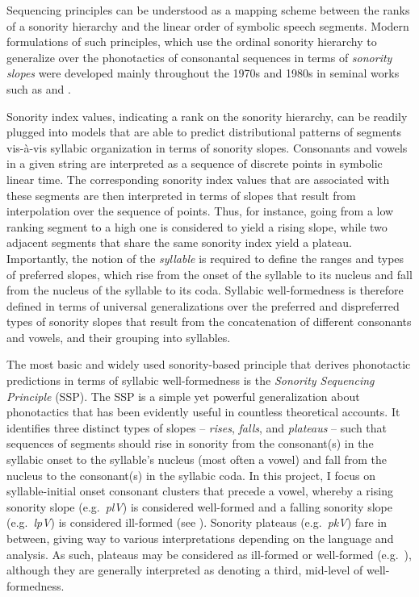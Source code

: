 Sequencing principles can be understood as a mapping scheme between the ranks of a sonority hierarchy and the linear order of symbolic speech segments.
Modern formulations of such principles, which use the ordinal sonority hierarchy to generalize over the phonotactics of consonantal sequences in terms of \emph{sonority slopes} were developed mainly throughout the 1970s and 1980s in seminal works such as \citet{zwicky1972notesk, hankamer1974sonority, hooper1976introduction, kiparsky1979metrical, lowenstamm1981maximal, steriade1982greek, cairns1982markedness, selkirk1984majorsk, harris1983syllablesk, mohanan1986theory} and \citet{clements1990role}.

Sonority index values, indicating a rank on the sonority hierarchy, can be readily plugged into models that are able to predict distributional patterns of segments vis-à-vis syllabic organization in terms of sonority slopes. Consonants and vowels in a given string are interpreted as a sequence of discrete points in symbolic linear time. The corresponding sonority index values that are associated with these segments are then interpreted in terms of slopes that result from interpolation over the sequence of points. Thus, for instance, going from a low ranking segment to a high one is considered to yield a rising slope, while two adjacent segments that share the same sonority index yield a plateau. Importantly, the notion of the \emph{syllable} is required to define the ranges and types of preferred slopes, which rise from the onset of the syllable to its nucleus and fall from the nucleus of the syllable to its coda. Syllabic well-formedness is therefore defined in terms of universal generalizations over the preferred and dispreferred types of sonority slopes that result from the concatenation of different consonants and vowels, and their grouping into syllables.

The most basic and widely used sonority-based principle that derives phonotactic predictions in terms of syllabic well-formedness is the \emph{Sonority Sequencing Principle} (SSP). The SSP is a simple yet powerful generalization about phonotactics that has been evidently useful in countless theoretical accounts. It identifies three distinct types of slopes -- \emph{rises}, \emph{falls}, and \emph{plateaus} -- such that sequences of segments should rise in sonority from the consonant(s) in the syllabic onset to the syllable's nucleus (most often a vowel) and fall from the nucleus to the consonant(s) in the syllabic coda. In this project, I focus on syllable-initial onset consonant clusters that precede a vowel, whereby a rising sonority slope (e.g.~\emph{plV}) is considered well-formed and a falling sonority slope (e.g.~\emph{lpV}) is considered ill-formed (see ). Sonority plateaus (e.g.~\emph{pkV}) fare in between, giving way to various interpretations depending on the language and analysis. As such, plateaus may be considered as ill-formed or well-formed (e.g.~\citealt{blevins1995syllable, asherov2019syllablesk, bat1996selectingsk}), although they are generally interpreted as denoting a third, mid-level of well-formedness.


